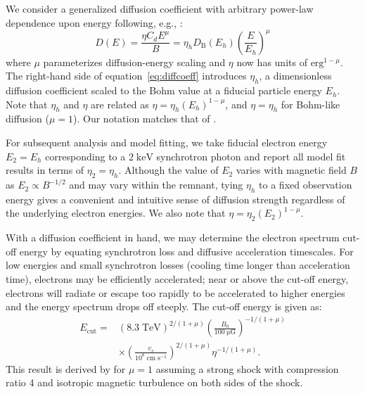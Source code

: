 \documentclass[iop, apj, numberedappendix]{emulateapj}
\newcommand*{\mt}{\mathrm}
\newcommand*{\unit}[1]{\;\mt{#1}}  %
\newcommand*{\Ecut}{E_{\mt{cut}}}
\newcommand*{\muG}{\unit{\mu G}}
\begin{document}
We consider a generalized diffusion coefficient with arbitrary
power-law dependence upon energy following, e.g., \citet{parizot2006}:
\begin{equation} \label{eq:diffcoeff}
    D(E) = \frac{\eta C_d E^\mu}{B}
         = \eta_h D_{\mt{B}}\left(E_h\right) \left(\frac{E}{E_h}\right)^\mu
\end{equation}
where $\mu$ parameterizes diffusion-energy scaling and $\eta$ now has units
of $\mt{erg}^{1-\mu}$.  The right-hand side of equation~\eqref{eq:diffcoeff}
introduces $\eta_h$, a dimensionless diffusion coefficient scaled to the Bohm
value at a fiducial particle energy $E_h$.  Note that $\eta_h$ and $\eta$ are
related as $\eta = \eta_h (E_h)^{1-\mu}$, and $\eta = \eta_h$ for Bohm-like
diffusion ($\mu = 1$).  Our notation matches that of .

For subsequent analysis and model fitting, we take fiducial electron energy
$E_2 = E_h$ corresponding to a $2 \unit{keV}$ synchrotron photon and report all
model fit results in terms of $\eta_2 = \eta_h$.  Although the value of $E_2$
varies with magnetic field $B$ as $E_2 \propto B^{-1/2}$ and may vary within
the remnant, tying $\eta_h$ to a fixed observation energy gives a convenient
and intuitive sense of diffusion strength regardless of the underlying electron
energies.  We also note that $\eta = \eta_2 (E_2)^{1-\mu}$.

With a diffusion coefficient in hand, we may determine the electron spectrum
cut-off energy by equating synchrotron loss and diffusive acceleration
timescales.  For low energies and small synchrotron losses (cooling time longer
than acceleration time), electrons may be efficiently accelerated; near or
above the cut-off energy, electrons will radiate or escape too rapidly to be
accelerated to higher energies and the energy spectrum drops off steeply.  The
cut-off energy is given as:
\begin{align} \label{eq:ecut}
    \Ecut =
        &\left(8.3\unit{TeV}\right)^{2/(1+\mu)}
        \left(\frac{B_0}{100 \muG}\right)^{-1/(1+\mu)} \nonumber \\
        &\times \left(\frac{v_s}{10^8 \unit{cm\;s^{-1}}}\right)^{2/(1+\mu)}
        \eta^{-1 / (1+\mu)} .
\end{align}
This result is derived by \citet{parizot2006} for $\mu=1$ assuming a strong
shock with compression ratio 4 and isotropic magnetic turbulence on both sides
of the shock.
\end{document}
